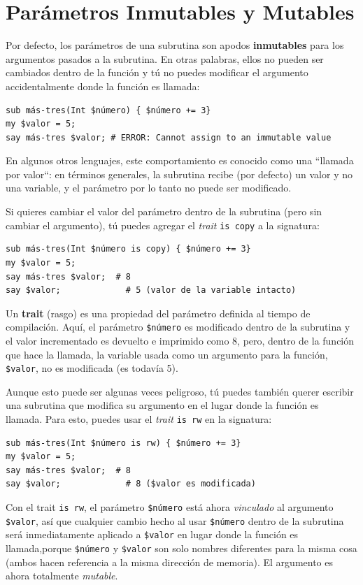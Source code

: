 \section{Parámetros Inmutables y Mutables}

Por defecto, los parámetros de una subrutina son apodos {\bf inmutables}
para los argumentos pasados a la subrutina. En otras palabras,
ellos no pueden ser cambiados dentro de la función y tú no puedes
modificar el argumento accidentalmente donde la función es llamada:

\begin{lstlisting}
sub más-tres(Int $número) { $número += 3}
my $valor = 5;
say más-tres $valor; # ERROR: Cannot assign to an immutable value
\end{lstlisting}

En algunos otros lenguajes, este comportamiento es conocido
como una ``llamada por valor``: en términos generales, 
la subrutina recibe (por defecto) un valor y no una variable, y 
el parámetro por lo tanto no puede ser modificado.

Si quieres cambiar el valor del parámetro dentro de la subrutina
(pero sin cambiar el argumento), tú puedes agregar el \emph{trait} 
{\tt is copy} a la signatura:

\begin{lstlisting}
sub más-tres(Int $número is copy) { $número += 3}
my $valor = 5;
say más-tres $valor;  # 8
say $valor;             # 5 (valor de la variable intacto)
\end{lstlisting}
%
Un {\bf trait} (rasgo) es una propiedad del parámetro definida
al tiempo de compilación. Aquí, el parámetro {\tt \$número} es
modificado dentro de la subrutina y el valor incrementado es devuelto e 
imprimido como 8, pero, dentro de la función que hace la llamada,
la variable usada como un argumento para la función, {\tt \$valor},
no es modificada (es todavía 5).

Aunque esto puede ser algunas veces peligroso, tú puedes 
también querer escribir una subrutina que modifica su argumento
en el lugar donde la función es llamada. Para esto, puedes usar
el \emph{trait} {\tt is rw} en la signatura:

\begin{lstlisting}
sub más-tres(Int $número is rw) { $número += 3}
my $valor = 5;
say más-tres $valor;  # 8
say $valor;             # 8 ($valor es modificada)
\end{lstlisting}
%
Con el trait {\tt is rw}, el parámetro {\tt \$número} está ahora
\emph{vinculado} al argumento {\tt \$valor}, así que cualquier
cambio hecho al usar {\tt \$número} dentro de la subrutina será 
inmediatamente aplicado a {\tt \$valor} en lugar donde la función
es llamada,porque {\tt \$número} y {\tt \$valor} son solo nombres
diferentes para la misma cosa (ambos hacen referencia a la misma
dirección de memoria). El argumento es ahora totalmente \emph{mutable}.

